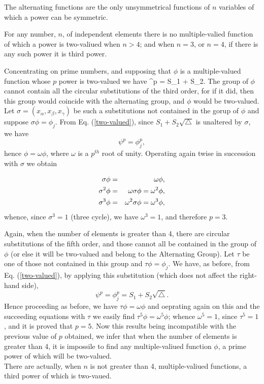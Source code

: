 \begin{theorem}
The alternating functions are the only unsymmetrical functions of $n$ variables of which a power can be symmetric.
\end{theorem}


\begin{theorem}
For any number, $n$, of independent elements there is no multiple-valied function of which a power is two-valiued when $n>4$; and when $n=3$, or $n=4$, if there is any such power it is
third power.
\end{theorem}

Concentrating on prime numbers, and supposing that $\phi$ is a multiple-valued function whose $p$ power is two-valued we have
\be \phi^p = S_1 + S_2\sqrt{\triangle}. \label{two-valued}\ee
The group of $\phi$ cannot contain all the circular substitutions of the third order, for if it did, then this group would coincide with the alternating group, and $\phi$ would be two-valued. Let
$\sigma = (x_\alpha, x_\beta, x_\gamma)$ be such a substitutions not contained in the gorup of $\phi$ and suppose $\sigma\phi = \phi_j$. From Eq. (\ref{two-valued}),
since $S_1 + S_2\sqrt{\triangle}$ is unaltered by $\sigma$, we have
\[ \psi^p = \phi_j^p,\] hence $\phi = \omega \phi$, where $\omega$ is a $p^{th}$ root of unity. Operating again twise in succession with $\sigma$ we obtain

\begin{eqnarray*}
\sigma \phi &=& \omega \phi,\cr
\sigma^2 \phi &=& \omega\sigma\phi = \omega^2 \phi,\cr
\sigma^3 \phi &=& \omega^2 \sigma \phi = \omega^3 \phi,\cr
\end{eqnarray*}whence, since $\sigma^3 = 1$ (three cycle), we have $\omega^3 = 1$, and therefore $p=3$.

Again, when the number of elements is greater than 4, there are circular substitutions of the fifth order, and those cannot all be contained in the group of $\phi$ (or else it will be two-valued and belong to the Alternating Group). Let $\tau$ be one of those not contained in this group and $\tau \phi = \phi_j$. We have, as before, from Eq. (\ref{two-valued}), by applying this substitution
(which does not affect the right-hand side),
\[ \psi^p = \phi_j^p = S_1 + S_2\sqrt{\triangle}.\] Hence proceeding as before, we have $\tau\phi = \omega\phi$ and oeprating again on this and the succeeding equations with $\tau$ we
easily find $\tau^5 \phi = \omega^5 \phi$; whence $\omega^5 = 1$, since $\tau^5 = 1$, and it is proved that $p=5$. Now this results being incompatible with the previous value of $p$
obtained, we infer that when the number of elements is greater than 4, it is impossile to find any multiple-valiued function $\phi$, a prime power of which will be two-valued.\\

There are actually, when $n$ is not greater than 4, multiple-valiued functions, a third power of which is two-vaued.
